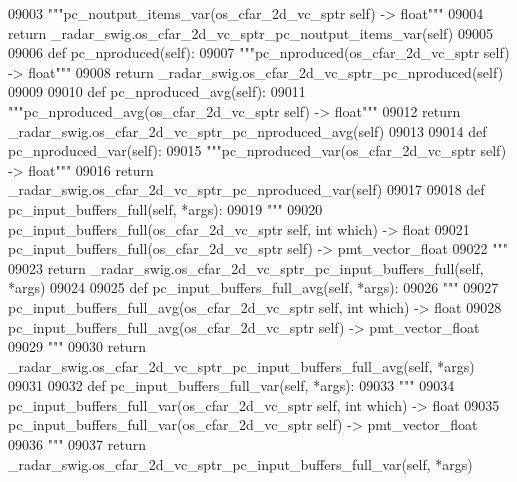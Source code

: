 \begin{DoxyCode}
{{{{{{{{{{{{{{{{{{{{{{{{{{{{{09003         \textcolor{stringliteral}{"""pc\_noutput\_items\_var(os\_cfar\_2d\_vc\_sptr self) -> float"""}
09004         \textcolor{keywordflow}{return} \_radar\_swig.os\_cfar\_2d\_vc\_sptr\_pc\_noutput\_items\_var(self)
09005 
09006     \textcolor{keyword}{def }pc_nproduced(self):
09007         \textcolor{stringliteral}{"""pc\_nproduced(os\_cfar\_2d\_vc\_sptr self) -> float"""}
09008         \textcolor{keywordflow}{return} \_radar\_swig.os\_cfar\_2d\_vc\_sptr\_pc\_nproduced(self)
09009 
09010     \textcolor{keyword}{def }pc_nproduced_avg(self):
09011         \textcolor{stringliteral}{"""pc\_nproduced\_avg(os\_cfar\_2d\_vc\_sptr self) -> float"""}
09012         \textcolor{keywordflow}{return} \_radar\_swig.os\_cfar\_2d\_vc\_sptr\_pc\_nproduced\_avg(self)
09013 
09014     \textcolor{keyword}{def }pc_nproduced_var(self):
09015         \textcolor{stringliteral}{"""pc\_nproduced\_var(os\_cfar\_2d\_vc\_sptr self) -> float"""}
09016         \textcolor{keywordflow}{return} \_radar\_swig.os\_cfar\_2d\_vc\_sptr\_pc\_nproduced\_var(self)
09017 
09018     \textcolor{keyword}{def }pc_input_buffers_full(self, *args):
09019         \textcolor{stringliteral}{"""}
09020 \textcolor{stringliteral}{        pc\_input\_buffers\_full(os\_cfar\_2d\_vc\_sptr self, int which) -> float}
09021 \textcolor{stringliteral}{        pc\_input\_buffers\_full(os\_cfar\_2d\_vc\_sptr self) -> pmt\_vector\_float}
09022 \textcolor{stringliteral}{        """}
09023         \textcolor{keywordflow}{return} \_radar\_swig.os\_cfar\_2d\_vc\_sptr\_pc\_input\_buffers\_full(self, *args)
09024 
09025     \textcolor{keyword}{def }pc_input_buffers_full_avg(self, *args):
09026         \textcolor{stringliteral}{"""}
09027 \textcolor{stringliteral}{        pc\_input\_buffers\_full\_avg(os\_cfar\_2d\_vc\_sptr self, int which) -> float}
09028 \textcolor{stringliteral}{        pc\_input\_buffers\_full\_avg(os\_cfar\_2d\_vc\_sptr self) -> pmt\_vector\_float}
09029 \textcolor{stringliteral}{        """}
09030         \textcolor{keywordflow}{return} \_radar\_swig.os\_cfar\_2d\_vc\_sptr\_pc\_input\_buffers\_full\_avg(self, *args)
09031 
09032     \textcolor{keyword}{def }pc_input_buffers_full_var(self, *args):
09033         \textcolor{stringliteral}{"""}
09034 \textcolor{stringliteral}{        pc\_input\_buffers\_full\_var(os\_cfar\_2d\_vc\_sptr self, int which) -> float}
09035 \textcolor{stringliteral}{        pc\_input\_buffers\_full\_var(os\_cfar\_2d\_vc\_sptr self) -> pmt\_vector\_float}
09036 \textcolor{stringliteral}{        """}
09037         \textcolor{keywordflow}{return} \_radar\_swig.os\_cfar\_2d\_vc\_sptr\_pc\_input\_buffers\_full\_var(self, *args)
}}}}}}}}}}}}}}}}}}}}}}}}}}}}}
\end{DoxyCode}
